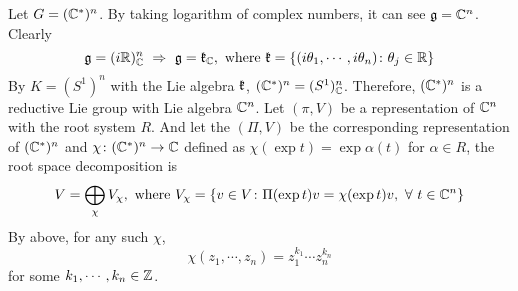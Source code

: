 \documentclass[a4paper,12pt]{article}
\begin{document}
	\begin{exam}
		Let $G = (\mathbb{C}^*)^n$. By taking logarithm of complex numbers, it can see $\mathfrak{g} = \mathbb{C}^n$. Clearly
		\begin{equation*}
			\mathfrak{g} = (i\mathbb{R})^n_{\mathbb{C}} ~\Rightarrow~ \mathfrak{g} = \mathfrak{k}_{\mathbb{C}},\text{ where }\mathfrak{k} = \left\{(i\theta_1,\cdots,i\theta_n) \colon \theta_j \in \mathbb{R}\right\}
		\end{equation*}
		By $K = (S^1)^n$ with the Lie algebra $\mathfrak{k}$, $(\mathbb{C}^*)^n = (S^1)^n_{\mathbb{C}}$. Therefore, $(\mathbb{C}^*)^n$ is a reductive Lie group with Lie algebra $\mathbb{C}^n$. Let $(\pi,V)$ be a representation of $\mathbb{C}^n$ with the root system $R$.  And let the $(\Pi,V)$ be the corresponding representation of $(\mathbb{C}^*)^n$ and $\chi \colon (\mathbb{C}^*)^n \rightarrow \mathbb{C}$  defined as $\chi(\exp t) = \exp \alpha(t)$ for $\alpha \in R$, the root space decomposition is
		\begin{equation*}
			V = \bigoplus_{\chi} V_{\chi}, \text{ where }V_{\chi} = \left\{v \in V \colon \Pi(\exp{t})v = \chi(\exp t) v,~\forall~t \in \mathbb{C}^n\right\}
		\end{equation*}
		By above, for any such $\chi$,
		\begin{equation*}
			\chi(z_1,\cdots,z_n) = z_1^{k_1}\cdots z_n^{k_n}
		\end{equation*}
		for some $k_1,\cdots,k_n \in \mathbb{Z}$.	
	\end{exam}
\end{document}
